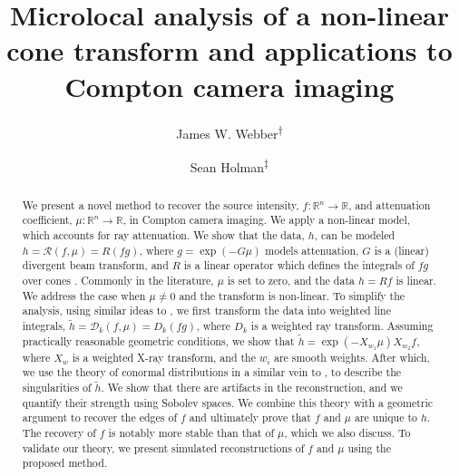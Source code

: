 \documentclass[a4paper,12pt]{amsart}
\title[short]{Microlocal analysis of a non-linear cone transform and applications to Compton camera imaging\\%
}
\author{James W. Webber\textsuperscript{$\dagger$}}
\author{Sean Holman\textsuperscript{$\ddagger$}}
\numberwithin{equation}{section}
\theoremstyle{plain}
\numberwithin{theorem}{section}
\theoremstyle{definition}
\theoremstyle{remark}
\theoremstyle{remark}
\theoremstyle{remark}
\begin{document}
\begin{abstract}
We present a novel method to recover the source intensity, $f : \mathbb{R}^n \to \mathbb{R}$, and attenuation coefficient, $\mu : \mathbb{R}^n \to \mathbb{R}$, in Compton camera imaging. We apply a non-linear model, which accounts for ray attenuation. We show that the data, $h$, can be modeled $h = \mathcal{R}(f,\mu) = R(fg)$, where $g = \exp(-G\mu)$ models attenuation, $G$ is a (linear) divergent beam transform, and $R$ is a linear operator which defines the integrals of $fg$ over cones \cite{kuchment2017inversion}. Commonly in the literature, $\mu$ is set to zero, and the data $h = Rf$ is linear. We address the case when $\mu \neq 0$ and the transform is non-linear. To simplify the analysis, using similar ideas to \cite{kuchment2017inversion}, we first transform the data into weighted line integrals, $\tilde{h} = \mathcal{D}_k(f,\mu) = D_k(fg)$, where $D_k$ is a weighted ray transform. Assuming practically reasonable geometric conditions, we show that $\tilde{h} = \exp(-X_{w_1}\mu)X_{w_2}f$, where $X_w$ is a weighted X-ray transform, and the $w_i$ are smooth weights. After which, we use the theory of conormal distributions in a similar vein to \cite{palacios2018quantitative}, to describe the singularities of $\tilde{h}$. We show that there are artifacts in the reconstruction, and we quantify their strength using Sobolev spaces. We combine this theory with a geometric argument to recover the edges of $f$ and ultimately prove that $f$ and $\mu$ are unique to $h$. The recovery of $f$ is notably more stable than that of $\mu$, which we also discuss. To validate our theory, we present simulated reconstructions of $f$ and $\mu$ using the proposed method.



\end{abstract}
\end{document}
